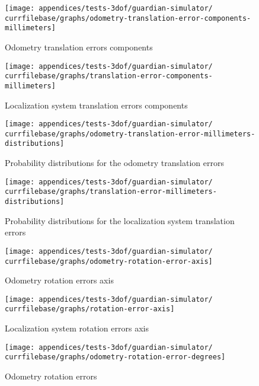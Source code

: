 \begin{figure}[H]
	\centering
	\texttt{[image: appendices/tests-3dof/guardian-simulator/\\currfilebase/graphs/odometry-translation-error-components-millimeters]}
	\caption{Odometry translation errors components}
\end{figure}

\begin{figure}[H]
	\centering
	\texttt{[image: appendices/tests-3dof/guardian-simulator/\\currfilebase/graphs/translation-error-components-millimeters]}
	\caption{Localization system translation errors components}
\end{figure}



\begin{figure}[H]
	\centering
	\texttt{[image: appendices/tests-3dof/guardian-simulator/\\currfilebase/graphs/odometry-translation-error-millimeters-distributions]}
	\caption{Probability distributions for the odometry translation errors}
\end{figure}

\begin{figure}[H]
	\centering
	\texttt{[image: appendices/tests-3dof/guardian-simulator/\\currfilebase/graphs/translation-error-millimeters-distributions]}
	\caption{Probability distributions for the localization system translation errors}
\end{figure}


\begin{figure}[H]
	\centering
	\texttt{[image: appendices/tests-3dof/guardian-simulator/\\currfilebase/graphs/odometry-rotation-error-axis]}
	\caption{Odometry rotation errors axis}
\end{figure}

\begin{figure}[H]
	\centering
	\texttt{[image: appendices/tests-3dof/guardian-simulator/\\currfilebase/graphs/rotation-error-axis]}
	\caption{Localization system rotation errors axis}
\end{figure}


\begin{figure}[H]
	\centering
	\texttt{[image: appendices/tests-3dof/guardian-simulator/\\currfilebase/graphs/odometry-rotation-error-degrees]}
	\caption{Odometry rotation errors}
\end{figure}

